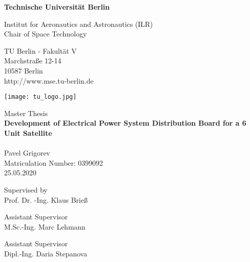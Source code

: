 \thispagestyle{empty}
\begin{center}

\vspace{1.0cm}
{\LARGE \textbf{Technische Universität Berlin}}

\vspace{0.5cm}

{\large Institut for Aeronautics and Astronautics (ILR)\\[1mm]}
{\large Chair of Space Technology\\[5mm]}

TU Berlin - Fakultät V\\
Marchstraße 12-14\\
10587 Berlin\\
http://www.mse.tu-berlin.de\\

\vspace*{1cm}

\texttt{[image: tu\_logo.jpg]}

\vspace*{1.0cm}

{\LARGE Master Thesis}\\

\vspace{1.0cm}
{\LARGE \textbf{Development of  Electrical Power System Distribution Board for a 6 Unit Satellite}}\\
\vspace*{0.3cm}
{\LARGE \textbf{}}\\
\vspace*{1.0cm}
{\LARGE Pavel Grigorev}
\\
\vspace*{0.5cm}
Matriculation Number: 0399092\\
25.05.2020\\ %
\vspace*{1.0cm}


Supervised by\\
Prof. Dr. -Ing. Klaus Brieß\\
\vspace*{0.5cm}

Assistant Supervisor\\
M.Sc.-Ing. Marc Lehmann
\vspace*{0.5cm}

Assistant Supervisor\\
Dipl.-Ing. Daria Stepanova
\vspace{3cm}




\end{center}


